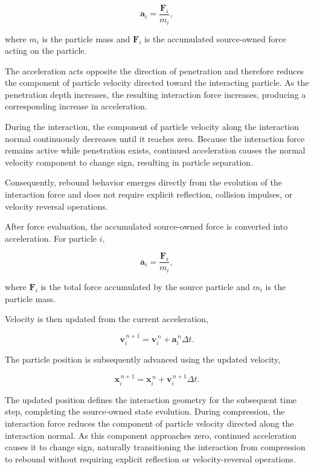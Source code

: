 \begin{equation}
\mathbf{a}_i = \frac{\mathbf{F}_i}{m_i},
\end{equation}

where $m_i$ is the particle mass and
$\mathbf{F}_i$ is the accumulated source-owned force
acting on the particle.

The acceleration acts opposite the direction of
penetration and therefore reduces the component of
particle velocity directed toward the interacting
particle. As the penetration depth increases, the
resulting interaction force increases, producing a
corresponding increase in acceleration.

During the interaction, the component of particle
velocity along the interaction normal continuously
decreases until it reaches zero. Because the
interaction force remains active while penetration
exists, continued acceleration causes the normal
velocity component to change sign, resulting in
particle separation.

Consequently, rebound behavior emerges directly from
the evolution of the interaction force and does not
require explicit reflection, collision impulses, or
velocity reversal operations.

After force evaluation, the accumulated source-owned
force is converted into acceleration. For particle $i$,

\begin{equation}
\mathbf{a}_i
=
\frac{\mathbf{F}_i}{m_i},
\end{equation}

where $\mathbf{F}_i$ is the total force accumulated
by the source particle and $m_i$ is the particle mass.

Velocity is then updated from the current acceleration,

\begin{equation}
\mathbf{v}_i^{\,n+1}=\mathbf{v}_i^{\,n}+\mathbf{a}_i^{\,n}\Delta t .
\end{equation}

The particle position is subsequently advanced using
the updated velocity,

\begin{equation}
\mathbf{x}_i^{\,n+1}
=
\mathbf{x}_i^{\,n}
+
\mathbf{v}_i^{\,n+1}\Delta t.
\end{equation}

The updated position defines the interaction geometry
for the subsequent time step, completing the
source-owned state evolution. During compression, the
interaction force reduces the component of particle
velocity directed along the interaction normal. As
this component approaches zero, continued
acceleration causes it to change sign, naturally
transitioning the interaction from compression to
rebound without requiring explicit reflection or
velocity-reversal operations.


